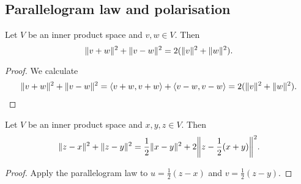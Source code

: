 \subsection{Parallelogram law and polarisation}
\begin{theorem} \label{parallelogramLaw}
Let $V$ be an inner product space and $v,w\in V$. Then
\[ \lVert v+w\rVert^2 + \lVert v-w\rVert^2 = 2 (\lVert v\rVert^2+\lVert w\rVert^2). \]
\end{theorem}
\begin{proof}
We calculate
\begin{align*}
\lVert v+w\rVert^2 + \lVert v-w\rVert^2 = \left\langle v+w, v+w \right\rangle+\left\langle v-w,v-w \right\rangle = 2(\lVert v\rVert^2 + \lVert w\rVert^2).
\end{align*}
\end{proof}
\begin{corollary}
Let $V$ be an inner product space and $x,y,z\in V$. Then
\[ \norm{z-x}^2 + \norm{z-y}^2 = \frac{1}{2}\norm{x-y}^2 + 2\norm*{z-\frac{1}{2}(x+y)}^2. \]
\end{corollary}
\begin{proof}
Apply the parallelogram law to $u = \frac{1}{2}(z-x)$ and $v = \frac{1}{2}(z-y)$.
\end{proof}

